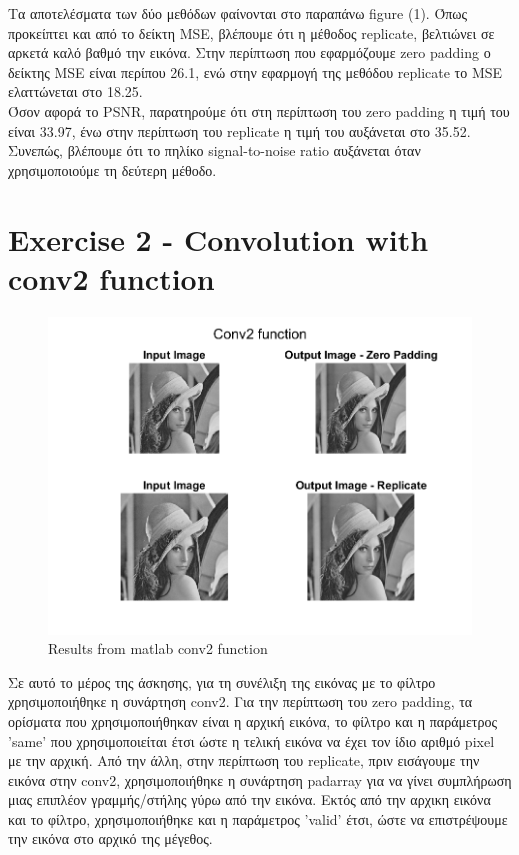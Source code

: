 \documentclass{article}
\begin{document}
	\noindent
	Τα αποτελέσματα των δύο μεθόδων φαίνονται στο παραπάνω figure (1). Όπως προκείπτει και από το δείκτη MSE, βλέπουμε ότι η μέθοδος replicate, βελτιώνει σε αρκετά καλό βαθμό την εικόνα. Στην περίπτωση που εφαρμόζουμε zero padding ο δείκτης MSE είναι περίπου 26.1, ενώ στην εφαρμογή της μεθόδου replicate το MSE ελαττώνεται στο 18.25.\\
	
	\noindent
	Όσον αφορά το PSNR, παρατηρούμε ότι στη περίπτωση του zero padding η τιμή του είναι 33.97, ένω στην περίπτωση του replicate η τιμή του αυξάνεται στο 35.52. Συνεπώς, βλέπουμε ότι το πηλίκο signal-to-noise ratio αυξάνεται όταν χρησιμοποιούμε τη δεύτερη μέθοδο.

\section*{Exercise 2 - Convolution with conv2 function}
	\begin{figure}[h!]
		\centering
		\includegraphics[width=0.8\linewidth]{./output_images/conv2_func.png}
		\caption{Results from matlab conv2 function}
	\end{figure}

	\noindent
	Σε αυτό το μέρος της άσκησης, για τη συνέλιξη της εικόνας με το φίλτρο χρησιμοποιήθηκε η συνάρτηση conv2. Για την περίπτωση του zero padding, τα ορίσματα που χρησιμοποιήθηκαν είναι η αρχική εικόνα, το φίλτρο και η παράμετρος 'same' που χρησιμοποιείται έτσι ώστε η τελική εικόνα να έχει τον ίδιο αριθμό pixel με την αρχική. Από την άλλη, στην περίπτωση του replicate, πριν εισάγουμε την εικόνα στην conv2, χρησιμοποιήθηκε η συνάρτηση padarray για να γίνει συμπλήρωση μιας επιπλέον γραμμής/στήλης γύρω από την εικόνα. Εκτός από την αρχικη εικόνα και το φίλτρο, χρησιμοποιήθηκε και η παράμετρος 'valid' έτσι, ώστε να επιστρέψουμε την εικόνα στο αρχικό της μέγεθος. \\
	
\end{document}
